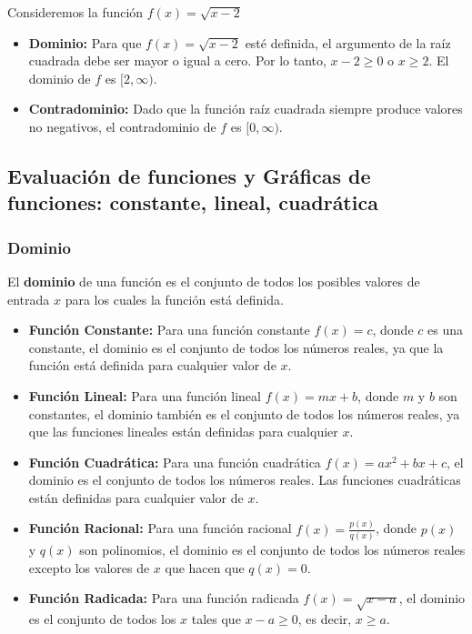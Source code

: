 \begin{problem}
    Consideremos la función \( f(x) = \sqrt{x-2} \)

\begin{itemize}
    \item \textbf{Dominio:} Para que \( f(x) = \sqrt{x-2} \) esté definida, el argumento de la raíz cuadrada debe ser mayor o igual a cero. Por lo tanto, \( x-2 \geq 0 \) o \( x \geq 2 \). El dominio de \( f \) es \( [2, \infty) \).
    \item \textbf{Contradominio:} Dado que la función raíz cuadrada siempre produce valores no negativos, el contradominio de \( f \) es \( [0, \infty) \).
\end{itemize}

\end{problem}

\subsection{Evaluación de funciones y Gráficas de funciones: constante, lineal, cuadrática}

\subsubsection{Dominio}

El \textbf{dominio} de una función es el conjunto de todos los posibles valores de entrada \( x \) para los cuales la función está definida.

\begin{itemize}
    \item \textbf{Función Constante:} Para una función constante \( f(x) = c \), donde \( c \) es una constante, el dominio es el conjunto de todos los números reales, ya que la función está definida para cualquier valor de \( x \).
    
    \item \textbf{Función Lineal:} Para una función lineal \( f(x) = mx + b \), donde \( m \) y \( b \) son constantes, el dominio también es el conjunto de todos los números reales, ya que las funciones lineales están definidas para cualquier \( x \).

    \item \textbf{Función Cuadrática:} Para una función cuadrática \( f(x) = ax^2 + bx + c \), el dominio es el conjunto de todos los números reales. Las funciones cuadráticas están definidas para cualquier valor de \( x \).

    \item \textbf{Función Racional:} Para una función racional \( f(x) = \frac{p(x)}{q(x)} \), donde \( p(x) \) y \( q(x) \) son polinomios, el dominio es el conjunto de todos los números reales excepto los valores de \( x \) que hacen que \( q(x) = 0 \).
    
    \item \textbf{Función Radicada:} Para una función radicada \( f(x) = \sqrt{x - a} \), el dominio es el conjunto de todos los \( x \) tales que \( x - a \geq 0 \), es decir, \( x \geq a \).
\end{itemize}

